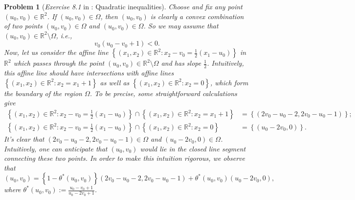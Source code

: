 \documentclass[11pt]{article}
\newtheorem{problem}{Problem}
\numberwithin{equation}{problem}
\begin{document}
\begin{problem} [\emph{Exercise 8.1} in \cite{calafiore2014optimization}: Quadratic inequalities]
{\indent Choose and fix any point $\left( u_0, v_0 \right) \in \mathbb{R}^2$. If $\left( u_0, v_0 \right) \in \Omega$, then $\left( u_0, v_0 \right)$ is clearly a convex combination of two points $\left( u_0, v_0 \right) \in \Omega$ and $\left( u_0, v_0 \right) \in \Omega$. So we may assume that $\left( u_0, v_0 \right) \in \mathbb{R}^2 \setminus \Omega$, \emph{i.e.},
\begin{equation}
    \label{eqn4.3}
    v_0 \left( u_0 - v_0 + 1 \right) < 0.
\end{equation}
Now, let us consider the affine line $\left\{ \left( x_1, x_2 \right) \in \mathbb{R}^2 : x_2 - v_0 = \frac{1}{2} \left( x_1 - u_0 \right) \right\}$ in $\mathbb{R}^2$ which passes through the point $\left( u_0, v_0 \right) \in \mathbb{R}^2 \setminus \Omega$ and has slope $\frac{1}{2}$. Intuitively, this affine line should have intersections with affine lines $\left\{ \left( x_1, x_2 \right) \in \mathbb{R}^2 : x_2 = x_1 + 1 \right\}$ as well as $\left\{ \left( x_1, x_2 \right) \in \mathbb{R}^2 : x_2 = 0 \right\}$, which form the boundary of the region $\Omega$. To be precise, some straightforward calculations give
\begin{equation*}
    \begin{split}
        \left\{ \left( x_1, x_2 \right) \in \mathbb{R}^2 : x_2 - v_0 = \frac{1}{2} \left( x_1 - u_0 \right) \right\} \cap \left\{ \left( x_1, x_2 \right) \in \mathbb{R}^2 : x_2 = x_1 + 1 \right\} 
        &= \left\{ \left( 2v_0 - u_0 - 2, 2v_0 - u_0 - 1 \right) \right\}; \\
        \left\{ \left( x_1, x_2 \right) \in \mathbb{R}^2 : x_2 - v_0 = \frac{1}{2} \left( x_1 - u_0 \right) \right\} \cap \left\{ \left( x_1, x_2 \right) \in \mathbb{R}^2 : x_2 = 0 \right\} &=
        \left\{ \left( u_0 - 2v_0, 0 \right) \right\}.
    \end{split}
\end{equation*}
It's clear that $\left( 2v_0 - u_0 - 2, 2v_0 - u_0 - 1 \right) \in \Omega$ and $\left( u_0 - 2v_0, 0 \right) \in \Omega$. Intuitively, one can anticipate that $\left( u_0, v_0 \right)$ would lie in the closed line segment connecting these two points. In order to make this intuition rigorous, we observe that
\begin{equation}
    \label{eqn4.4}
    \left( u_0, v_0 \right) = \left\{ 1 - \theta^* \left( u_0, v_0 \right) \right\} \left( 2v_0 - u_0 - 2, 2v_0 - u_0 - 1 \right) + \theta^* \left( u_0, v_0 \right) \left( u_0 - 2v_0, 0 \right),
\end{equation}
where $\theta^* \left( u_0, v_0 \right) := \frac{u_0 - v_0 + 1}{u_0 - 2 v_0 + 1}$.

}
\end{problem}
\end{document}
